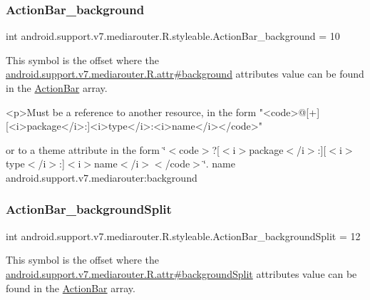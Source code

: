 \subsubsection{\texorpdfstring{Action\+Bar\+\_\+background}{ActionBar\_background}}
{\footnotesize\ttfamily int android.\+support.\+v7.\+mediarouter.\+R.\+styleable.\+Action\+Bar\+\_\+background = 10\hspace{0.3cm}{\ttfamily [static]}}

This symbol is the offset where the \hyperlink{classandroid_1_1support_1_1v7_1_1mediarouter_1_1R_1_1attr_a3bafd93ea64f8ac92ba9d29c95112cea}{android.\+support.\+v7.\+mediarouter.\+R.\+attr\#background} attribute\textquotesingle{}s value can be found in the \hyperlink{classandroid_1_1support_1_1v7_1_1mediarouter_1_1R_1_1styleable_adc4d3c0d096085367f12d025007aa53f}{Action\+Bar} array.

\begin{DoxyVerb}      <p>Must be a reference to another resource, in the form "<code>@[+][<i>package</i>:]<i>type</i>:<i>name</i></code>"
\end{DoxyVerb}
 or to a theme attribute in the form \char`\"{}$<$code$>$?\mbox{[}$<$i$>$package$<$/i$>$\+:\mbox{]}\mbox{[}$<$i$>$type$<$/i$>$\+:\mbox{]}$<$i$>$name$<$/i$>$$<$/code$>$\char`\"{}.  name android.\+support.\+v7.\+mediarouter\+:background \mbox{\label{classandroid_1_1support_1_1v7_1_1mediarouter_1_1R_1_1styleable_ab203bd1cd9b9493b6f496c4fb5593e92}} 
\subsubsection{\texorpdfstring{Action\+Bar\+\_\+background\+Split}{ActionBar\_backgroundSplit}}
{\footnotesize\ttfamily int android.\+support.\+v7.\+mediarouter.\+R.\+styleable.\+Action\+Bar\+\_\+background\+Split = 12\hspace{0.3cm}{\ttfamily [static]}}

This symbol is the offset where the \hyperlink{classandroid_1_1support_1_1v7_1_1mediarouter_1_1R_1_1attr_a92731fe75f35d0af8080a38400e926dd}{android.\+support.\+v7.\+mediarouter.\+R.\+attr\#background\+Split} attribute\textquotesingle{}s value can be found in the \hyperlink{classandroid_1_1support_1_1v7_1_1mediarouter_1_1R_1_1styleable_adc4d3c0d096085367f12d025007aa53f}{Action\+Bar} array.

